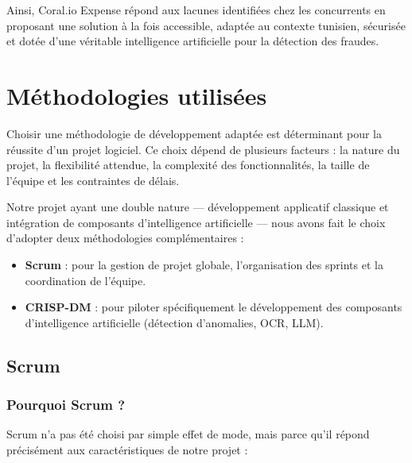 \documentclass[12pt,a4paper]{report}
\begin{document}
Ainsi, Coral.io Expense répond aux lacunes identifiées chez les concurrents en proposant une solution à la fois accessible, adaptée au contexte tunisien, sécurisée et dotée d'une véritable intelligence artificielle pour la détection des fraudes.



\section{Méthodologies utilisées}

Choisir une méthodologie de développement adaptée est déterminant pour la réussite d'un projet logiciel. Ce choix dépend de plusieurs facteurs : la nature du projet, la flexibilité attendue, la complexité des fonctionnalités, la taille de l'équipe et les contraintes de délais.

Notre projet ayant une double nature — développement applicatif classique et intégration de composants d'intelligence artificielle — nous avons fait le choix d'adopter deux méthodologies complémentaires :
\begin{itemize}
 \item \textbf{Scrum} : pour la gestion de projet globale, l'organisation des sprints et la coordination de l'équipe.
 \item \textbf{CRISP-DM} : pour piloter spécifiquement le développement des composants d'intelligence artificielle (détection d'anomalies, OCR, LLM).
\end{itemize}




\subsection{Scrum}
\subsubsection{Pourquoi Scrum ?}


Scrum n’a pas été choisi par simple effet de mode, mais parce qu’il répond précisément aux caractéristiques de notre projet :
\end{document}
